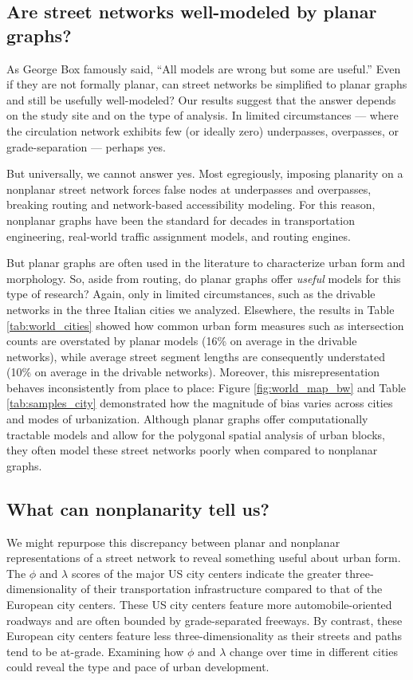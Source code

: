 \documentclass[Afour,sageh,times]{sagej}
\begin{document}
\subsection{Are street networks well-modeled by planar graphs?}

As George Box famously said, \enquote{All models are wrong but some are useful.} Even if they are not formally planar, can street networks be simplified to planar graphs and still be usefully well-modeled? Our results suggest that the answer depends on the study site and on the type of analysis. In limited circumstances --- where the circulation network exhibits few (or ideally zero) underpasses, overpasses, or grade-separation --- perhaps yes.

But universally, we cannot answer yes. Most egregiously, imposing planarity on a nonplanar street network forces false nodes at underpasses and overpasses, breaking routing and network-based accessibility modeling. For this reason, nonplanar graphs have been the standard for decades in transportation engineering, real-world traffic assignment models, and routing engines.

But planar graphs are often used in the literature to characterize urban form and morphology. So, aside from routing, do planar graphs offer \emph{useful} models for this type of research? Again, only in limited circumstances, such as the drivable networks in the three Italian cities we analyzed. Elsewhere, the results in Table \ref{tab:world_cities} showed how common urban form measures such as intersection counts are overstated by planar models (16\% on average in the drivable networks), while average street segment lengths are consequently understated (10\% on average in the drivable networks). Moreover, this misrepresentation behaves inconsistently from place to place: Figure \ref{fig:world_map_bw} and Table \ref{tab:samples_city} demonstrated how the magnitude of bias varies across cities and modes of urbanization. Although planar graphs offer computationally tractable models and allow for the polygonal spatial analysis of urban blocks, they often model these street networks poorly when compared to nonplanar graphs.


\subsection{What can nonplanarity tell us?}

We might repurpose this discrepancy between planar and nonplanar representations of a street network to reveal something useful about urban form. The $\phi$ and $\lambda$ scores of the major US city centers indicate the greater three-dimensionality of their transportation infrastructure compared to that of the European city centers. These US city centers feature more automobile-oriented roadways and are often bounded by grade-separated freeways. By contrast, these European city centers feature less three-dimensionality as their streets and paths tend to be at-grade. Examining how $\phi$ and $\lambda$ change over time in different cities could reveal the type and pace of urban development. 
\end{document}
